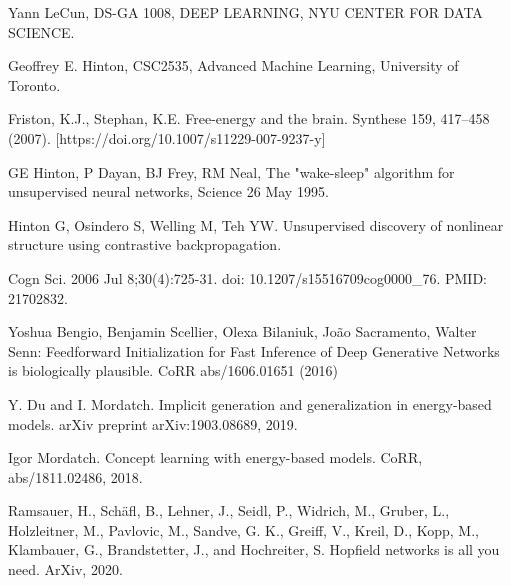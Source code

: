 \documentclass{article}
\begin{document}
\newpage
\begin{thebibliography}{}

\bibitem[]{}
Yann LeCun, DS-GA 1008, DEEP LEARNING, NYU CENTER FOR DATA SCIENCE.


\bibitem[]{}
Geoffrey E. Hinton, CSC2535, Advanced Machine Learning, University of Toronto.


\bibitem[]{}
Friston, K.J., Stephan, K.E. Free-energy and the brain. Synthese 159, 417–458 (2007). [https://doi.org/10.1007/s11229-007-9237-y]

\bibitem[]{}
GE Hinton, P Dayan, BJ Frey, RM Neal, The "wake-sleep" algorithm for unsupervised neural networks, Science  26 May 1995.


\bibitem[]{}
Hinton G, Osindero S, Welling M, Teh YW. Unsupervised discovery of nonlinear structure using contrastive backpropagation. 

Cogn Sci. 2006 Jul 8;30(4):725-31. doi: 10.1207/s15516709cog0000\_76. PMID: 21702832.


\bibitem[]{}
Yoshua Bengio, Benjamin Scellier, Olexa Bilaniuk, João Sacramento, Walter Senn:
Feedforward Initialization for Fast Inference of Deep Generative Networks is biologically plausible. CoRR abs/1606.01651 (2016)


\bibitem[]{}
Y. Du and I. Mordatch. Implicit generation and generalization in energy-based models. arXiv preprint arXiv:1903.08689, 2019.


\bibitem[]{}
Igor Mordatch. Concept learning with energy-based models. CoRR, abs/1811.02486, 2018.


\bibitem[]{}
Ramsauer, H., Schäfl, B., Lehner, J., Seidl, P., Widrich, M., Gruber, L., Holzleitner, M., Pavlovic, M., Sandve, G. K., Greiff, V., Kreil, D., Kopp, M., Klambauer, G., Brandstetter, J., and Hochreiter, S.
Hopfield networks is all you need. ArXiv, 2020.

\end{thebibliography}
\end{document}
